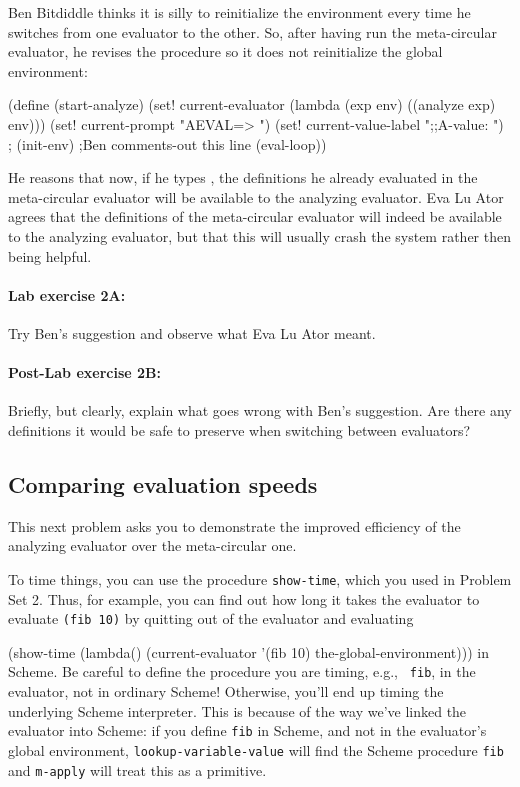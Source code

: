 \medskip

Ben Bitdiddle thinks it is silly to reinitialize the environment every
time he switches from one evaluator to the other.  So, after having
run the meta-circular evaluator, he revises the 
procedure so it does not reinitialize the global environment:

\beginlisp
(define (start-analyze)
  (set! current-evaluator (lambda (exp env) ((analyze exp) env)))
  (set! current-prompt "AEVAL=> ")
  (set! current-value-label ";;A-value: ")
;  (init-env)              ;Ben comments-out this line
  (eval-loop))
\endlisp

He reasons that now, if he types , the
definitions he already evaluated in the meta-circular evaluator will
be available to the analyzing evaluator.  Eva Lu Ator agrees that the
definitions of the meta-circular evaluator will indeed be available to
the analyzing evaluator, but that this will usually crash the system
rather then being helpful.

\paragraph{Lab exercise 2A:}
Try Ben's suggestion and observe what Eva Lu Ator meant.

\paragraph{Post-Lab exercise 2B:}
Briefly, but clearly, explain what goes wrong with Ben's suggestion.
Are there any definitions it would be safe to preserve when switching
between evaluators?

\subsection{Comparing evaluation speeds}

This next problem asks you to demonstrate the improved efficiency of
the analyzing evaluator over the meta-circular one.

To time things, you can use the procedure {\tt show-time}, which you used
in Problem Set 2.  Thus, for example, you can find out how long it takes
the evaluator to evaluate {\tt (fib 10)} by quitting out of the evaluator
and evaluating

\beginlisp
(show-time (lambda() (current-evaluator '(fib 10) the-global-environment)))
\endlisp
in Scheme.  Be careful to define the procedure you are timing, e.g., {\tt
fib}, in the evaluator, not in ordinary Scheme!  Otherwise, you'll end up
timing the underlying Scheme interpreter.  This is because of the way
we've linked the evaluator into Scheme: if you define {\tt fib} in Scheme,
and not in the evaluator's global environment, {\tt lookup-variable-value}
will find the Scheme procedure {\tt fib} and {\tt m-apply} will treat this
as a primitive.

